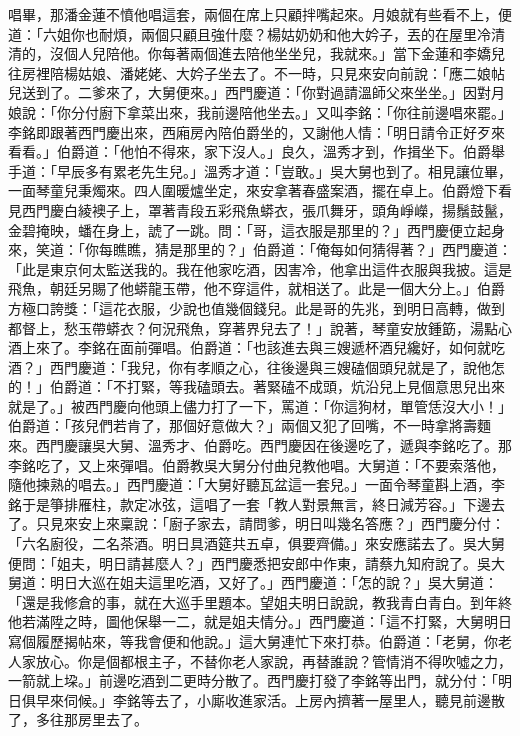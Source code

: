 唱畢，那潘金蓮不憤他唱這套，兩個在席上只顧拌嘴起來。月娘就有些看不上，便道：「六姐你也耐煩，兩個只顧且強什麼？楊姑奶奶和他大妗子，丟的在屋里冷清清的，沒個人兒陪他。你每著兩個進去陪他坐坐兒，我就來。」當下金蓮和李嬌兒往房裡陪楊姑娘、潘姥姥、大妗子坐去了。不一時，只見來安向前說：「應二娘帖兒送到了。二爹來了，大舅便來。」西門慶道：「你對過請溫師父來坐坐。」因對月娘說：「你分付廚下拿菜出來，我前邊陪他坐去。」又叫李銘：「你往前邊唱來罷。」李銘即跟著西門慶出來，西廂房內陪伯爵坐的，又謝他人情：「明日請令正好歹來看看。」伯爵道：「他怕不得來，家下沒人。」良久，溫秀才到，作揖坐下。伯爵舉手道：「早辰多有累老先生兒。」溫秀才道：「豈敢。」吳大舅也到了。相見讓位畢，一面琴童兒秉燭來。四人圍暖爐坐定，來安拿著春盛案酒，擺在卓上。伯爵燈下看見西門慶白綾襖子上，罩著青段五彩飛魚蟒衣，張爪舞牙，頭角崢嶸，揚鬚鼓鬣，金碧掩映，蟠在身上，諕了一跳。問：「哥，這衣服是那里的？」西門慶便立起身來，笑道：「你每瞧瞧，猜是那里的？」伯爵道：「俺每如何猜得著？」西門慶道：「此是東京何太監送我的。我在他家吃酒，因害冷，他拿出這件衣服與我披。這是飛魚，朝廷另賜了他蟒龍玉帶，他不穿這件，就相送了。此是一個大分上。」伯爵方極口誇獎：「這花衣服，少說也值幾個錢兒。此是哥的先兆，到明日高轉，做到都督上，愁玉帶蟒衣？何況飛魚，穿著界兒去了！」說著，琴童安放鍾筯，湯點心酒上來了。李銘在面前彈唱。伯爵道：「也該進去與三嫂遞杯酒兒纔好，如何就吃酒？」西門慶道：「我兒，你有孝順之心，往後邊與三嫂磕個頭兒就是了，說他怎的！」伯爵道：「不打緊，等我磕頭去。著緊磕不成頭，炕沿兒上見個意思兒出來就是了。」被西門慶向他頭上儘力打了一下，罵道：「你這狗材，單管恁沒大小！」伯爵道：「孩兒們若肯了，那個好意做大？」兩個又犯了回嘴，不一時拿將壽麵來。西門慶讓吳大舅、溫秀才、伯爵吃。西門慶因在後邊吃了，遞與李銘吃了。那李銘吃了，又上來彈唱。伯爵教吳大舅分付曲兒教他唱。大舅道：「不要索落他，隨他揀熟的唱去。」西門慶道：「大舅好聽瓦盆這一套兒。」一面令琴童斟上酒，李銘于是箏排雁柱，款定冰弦，這唱了一套「教人對景無言，終日減芳容。」下邊去了。只見來安上來稟說：「廚子家去，請問爹，明日叫幾名答應？」西門慶分付：「六名廚役，二名茶酒。明日具酒筵共五卓，俱要齊備。」來安應諾去了。吳大舅便問：「姐夫，明日請甚麼人？」西門慶悉把安郎中作東，請蔡九知府說了。吳大舅道：明日大巡在姐夫這里吃酒，又好了。」西門慶道：「怎的說？」吳大舅道：「還是我修倉的事，就在大巡手里題本。望姐夫明日說說，教我青白青白。到年終他若滿陞之時，圖他保舉一二，就是姐夫情分。」西門慶道：「這不打緊，大舅明日寫個履歷揭帖來，等我會便和他說。」這大舅連忙下來打恭。伯爵道：「老舅，你老人家放心。你是個都根主子，不替你老人家說，再替誰說？管情消不得吹噓之力，一箭就上垜。」前邊吃酒到二更時分散了。西門慶打發了李銘等出門，就分付：「明日俱早來伺候。」李銘等去了，小廝收進家活。上房內擠著一屋里人，聽見前邊散了，多往那房里去了。

